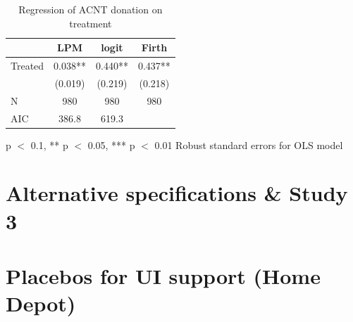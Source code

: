 \documentclass[
  11pt,
  oneside]{article}
\begin{document}
\begin{table}[H]
\centering\centering
\caption{\label{tab:fig-emerg-donate}Regression of ACNT donation on treatment  \label{tab:tab-donate-models-wmt-app}}
\centering
\begin{threeparttable}
\begin{tabular}[t]{lccc}
\toprule
  & LPM & logit & Firth\\
\midrule
Treated & \num{0.038}** & \num{0.440}** & \num{0.437}**\\
 & (\num{0.019}) & (\num{0.219}) & (\num{0.218})\\
\midrule
N & \num{980} & \num{980} & \num{980}\\
AIC & \num{386.8} & \num{619.3} & \\
\bottomrule
\end{tabular}
\begin{tablenotes}
\item * p $<$ 0.1, ** p $<$ 0.05, *** p $<$ 0.01 Robust standard errors for OLS model
\end{tablenotes}
\end{threeparttable}
\end{table}

\newpage

\section{Alternative specifications \& Study 3}\label{alternative-specifications-study-3}

\newpage

\section{Placebos for UI support (Home Depot)}\label{app-placebo}
\end{document}
